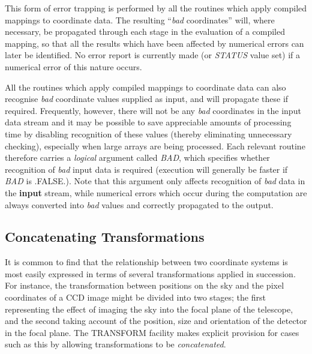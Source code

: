 \documentclass[twoside,11pt]{article}
\newcommand{\xlabel}[1]{}
\newcommand{\name}[1]{\mbox{\small{#1}}}
\newcommand{\fortvar}[1]{\mbox{\emph{#1}}}
\begin{document}
This form of error trapping is performed by all the routines which apply
compiled mappings to coordinate data. 
The resulting ``\emph{bad} coordinates'' will, where necessary, be propagated
through each stage in the evaluation of a compiled mapping, so that all the
results which have been affected by numerical errors can later be
identified. 
No error report is currently made (or \fortvar{STATUS} value set) if a
numerical error of this nature occurs. 

All the routines which apply compiled mappings to coordinate data can also
recognise \emph{bad} coordinate values supplied as input, and will propagate
these if required. 
Frequently, however, there will not be any \emph{bad} coordinates in the
input data stream and it may be possible to save appreciable amounts of
processing time by disabling recognition of these values (thereby
eliminating unnecessary checking), especially when large arrays are being
processed. 
Each relevant routine therefore carries a \emph{logical} argument called
\fortvar{BAD}, which specifies whether recognition of \emph{bad} input data
is required (execution will generally be faster if \fortvar{BAD} is
\name{.FALSE.}). 
Note that this argument only affects recognition of \emph{bad} data in the
\textbf{input} stream, while numerical errors which occur during the
computation are always converted into \emph{bad} values and correctly
propagated to the output. 


\subsection{\xlabel{concatenating_transformations}Concatenating Transformations}

\label{section:additional:concatenate}

It is common to find that the relationship between two coordinate systems is
most easily expressed in terms of several transformations applied in
succession. 
For instance, the transformation between positions on the sky and the pixel
coordinates of a \name{CCD} image might be divided into two stages; the
first representing the effect of imaging the sky into the focal plane of the
telescope, and the second taking account of the position, size and
orientation of the detector in the focal plane. 
The \name{TRANSFORM} facility makes explicit provision for cases such as
this by allowing transformations to be \emph{concatenated}. 
\end{document}
